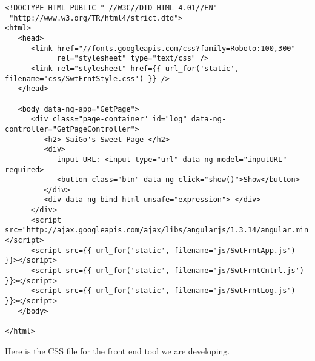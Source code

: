 \documentclass[11pt]{article}
\begin{document}
\begin{verbatim}
<!DOCTYPE HTML PUBLIC "-//W3C//DTD HTML 4.01//EN" 
 "http://www.w3.org/TR/html4/strict.dtd">
<html>
   <head>
      <link href="//fonts.googleapis.com/css?family=Roboto:100,300"
            rel="stylesheet" type="text/css" />
      <link rel="stylesheet" href={{ url_for('static', filename='css/SwtFrntStyle.css') }} />
   </head>

   <body data-ng-app="GetPage">
      <div class="page-container" id="log" data-ng-controller="GetPageController">
         <h2> SaiGo's Sweet Page </h2>
         <div> 
            input URL: <input type="url" data-ng-model="inputURL" required>
            <button class="btn" data-ng-click="show()">Show</button>
         </div>
         <div data-ng-bind-html-unsafe="expression"> </div>
      </div>    
      <script src="http://ajax.googleapis.com/ajax/libs/angularjs/1.3.14/angular.min.js"> </script>
      <script src={{ url_for('static', filename='js/SwtFrntApp.js')   }}></script>
      <script src={{ url_for('static', filename='js/SwtFrntCntrl.js') }}></script>
      <script src={{ url_for('static', filename='js/SwtFrntLog.js')   }}></script>
   </body>

</html>
\end{verbatim}

Here is the CSS file for the front end tool we are developing.
\end{document}
